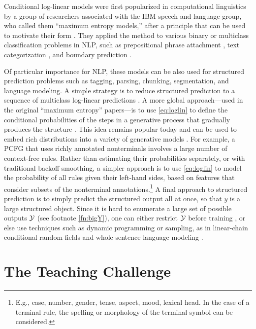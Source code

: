 \documentclass[11pt,letterpaper]{article}
\begin{document}
Conditional log-linear models were first popularized in computational
linguistics by a group of researchers associated with the IBM speech
and language group, who called them ``maximum entropy models,'' after
a principle that can be used to motivate their form
\cite{jaynes-1957}.  They applied the method to various binary or
multiclass classification problems in NLP, such as prepositional
phrase attachment \cite{ratnaparkhi-1994}, text categorization
\cite{nigam-lafferty-mccallum-1999}, and boundary prediction
\cite{beeferman-berger-lafferty-1999}.

Of particular importance for NLP, these models can be also used for
structured prediction problems such as tagging, parsing, chunking,
segmentation, and language modeling.  A simple strategy is to reduce
structured prediction to a sequence of multiclass log-linear
predictions \cite{ratnaparkhi-1998}.  A more global approach---used in
the original ``maximum entropy'' papers---is to use \eqref{eq:loglin}
to define the conditional probabilities of the steps in a generative
process that gradually produces the structure
\cite{rosenfeld-1994,berger-dellapietra-dellapietra-1996}.  This idea
remains popular today and can be used to embed rich distributions
into a variety of generative models \cite{bergkirkpatrick-et-al-2010}.
For example, a PCFG that uses richly annotated nonterminals involves a
large number of context-free rules.  Rather than estimating their
probabilities separately, or with traditional backoff smoothing, a
simpler approach is to use \eqref{eq:loglin} to model the probability
of all rules given their left-hand sides, based on features that
consider subsets of the nonterminal annotations.\footnote{E.g., case,
  number, gender, tense, aspect, mood, lexical head.  In the case of a
  terminal rule, the spelling or morphology of the terminal symbol can
  be considered.}  A final approach to structured prediction is to
simply predict the structured output all at once, so that $y$ is a
large structured object.  Since it is hard to enumerate
a large set of possible outputs ${\cal Y}$ (see footnote
\ref{fn:bigY}), one can either restrict ${\cal Y}$ before training
\cite{johnson-et-al-1999}, or else use techniques such as dynamic
programming or sampling, as in linear-chain conditional random fields
\cite{lafferty-mccallum-pereira-2001} and whole-sentence language
modeling \cite{rosenfeld-chen-zhu-2001}.

\section{The Teaching Challenge}
\end{document}
